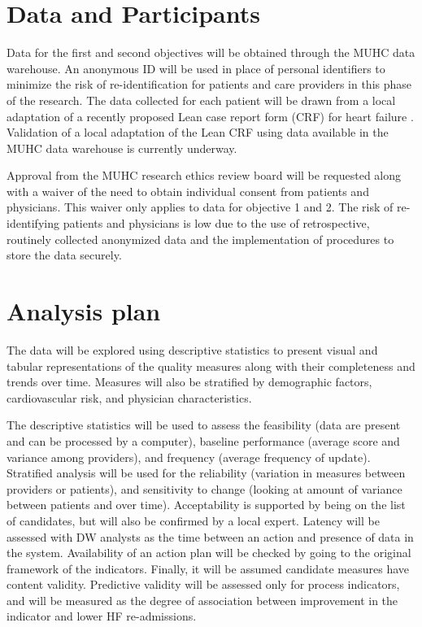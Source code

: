 \section{Data and Participants}
Data for the first and second objectives will be obtained through the MUHC data warehouse. An anonymous ID will be used in place of personal identifiers to minimize the risk of re-identification for patients and care providers in this phase of the research. The data collected for each patient will be drawn from a local adaptation of a recently proposed Lean case report form (\gls{CRF}) for heart failure \cite{psotka2019design}. Validation of a local adaptation of the Lean CRF using data available in the MUHC data warehouse is currently underway. 

Approval from the MUHC research ethics review board will be requested along with a waiver of the need to obtain individual consent from patients and physicians. This waiver only applies to data for objective 1 and 2. The risk of re-identifying patients and physicians is low due to the use of retrospective, routinely collected anonymized data and the implementation of procedures to store the data securely.

\section{Analysis plan}
The data will be explored using descriptive statistics to present visual and tabular representations of the quality measures along with their completeness and trends over time. Measures will also be stratified by demographic factors, cardiovascular risk, and physician characteristics.

The descriptive statistics will be used to assess the feasibility (data are present and can be processed by a computer), baseline performance (average score and variance among providers), and frequency (average frequency of update). Stratified analysis will be used for the reliability (variation in measures between providers or patients), and sensitivity to change (looking at amount of variance between patients and over time). Acceptability is supported by being on the list of candidates, but will also be confirmed by a local expert. Latency will be assessed with DW analysts as the time between an action and presence of data in the system. Availability of an action plan will be checked by going to the original framework of the indicators. Finally, it will be assumed candidate measures have content validity. Predictive validity will be assessed only for process indicators, and will be measured as the degree of association between improvement in the indicator and lower HF re-admissions.

